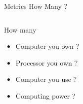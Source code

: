 %
\begin{Frame}{Metrics How Many ?}
  \begin{columns}[t]
    \begin{column}{5cm} %
      \begin{block}{How many}
        \begin{itemize}
        \item Computer you own ?
        \item Processor you own ?
        \item Computer you use ?
        \item Computing power ? 
        \end{itemize}
      \end{block} 
    \end{column}
    
  \end{columns}  
\end{Frame}


